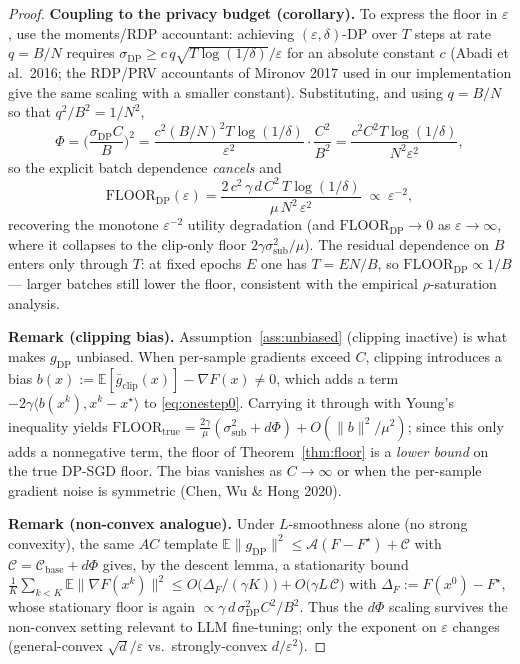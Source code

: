 \begin{proof}
\medskip
\noindent\textbf{Coupling to the privacy budget (corollary).}
To express the floor in $\varepsilon$, use the moments/RDP accountant: achieving $(\varepsilon,\delta)$-DP over $T$ steps at rate $q=B/N$ requires $\sigma_{\mathrm{DP}}\ge c\,q\sqrt{T\log(1/\delta)}/\varepsilon$ for an absolute constant $c$ (Abadi et al.\ 2016; the RDP/PRV accountants of Mironov 2017 used in our implementation give the same scaling with a smaller constant). Substituting, and using $q=B/N$ so that $q^2/B^2=1/N^2$,
\[
\Phi=\Big(\frac{\sigma_{\mathrm{DP}}C}{B}\Big)^2
=\frac{c^2 (B/N)^2 T\log(1/\delta)}{\varepsilon^2}\cdot\frac{C^2}{B^2}
=\frac{c^2 C^2 T\log(1/\delta)}{N^2\varepsilon^2},
\]
so the explicit batch dependence \emph{cancels} and
\[
\mathrm{FLOOR}_{\mathrm{DP}}(\varepsilon)=\frac{2\,c^2\,\gamma\,d\,C^2\,T\log(1/\delta)}{\mu\,N^2\,\varepsilon^2}\;\propto\;\varepsilon^{-2},
\]
recovering the monotone $\varepsilon^{-2}$ utility degradation (and $\mathrm{FLOOR}_{\mathrm{DP}}\to0$ as $\varepsilon\to\infty$, where it collapses to the clip-only floor $2\gamma\sigma_{\mathrm{sub}}^2/\mu$). The residual dependence on $B$ enters only through $T$: at fixed epochs $E$ one has $T=E N/B$, so $\mathrm{FLOOR}_{\mathrm{DP}}\propto 1/B$ --- larger batches still lower the floor, consistent with the empirical $\rho$-saturation analysis.

\medskip
\noindent\textbf{Remark (clipping bias).}
Assumption~\ref{ass:unbiased} (clipping inactive) is what makes $g_{\mathrm{DP}}$ unbiased. When per-sample gradients exceed $C$, clipping introduces a bias $b(x):=\mathbb E[\bar g_{\mathrm{clip}}(x)]-\nabla F(x)\ne0$, which adds a term $-2\gamma\langle b(x^k),x^k-x^\star\rangle$ to \eqref{eq:onestep0}. Carrying it through with Young's inequality yields $\mathrm{FLOOR}_{\mathrm{true}}=\tfrac{2\gamma}{\mu}(\sigma_{\mathrm{sub}}^2+d\Phi)+O(\|b\|^2/\mu^2)$; since this only adds a nonnegative term, the floor of Theorem~\ref{thm:floor} is a \emph{lower bound} on the true DP-SGD floor. The bias vanishes as $C\to\infty$ or when the per-sample gradient noise is symmetric (Chen, Wu \& Hong 2020).

\medskip
\noindent\textbf{Remark (non-convex analogue).}
Under $L$-smoothness alone (no strong convexity), the same $AC$ template $\mathbb E\|g_{\mathrm{DP}}\|^2\le \mathcal A(F-F^\star)+\mathcal C$ with $\mathcal C=\mathcal C_{\mathrm{base}}+d\Phi$ gives, by the descent lemma, a stationarity bound $\tfrac1K\sum_{k<K}\mathbb E\|\nabla F(x^k)\|^2\le O\!\big(\Delta_F/(\gamma K)\big)+O\!\big(\gamma L\,\mathcal C\big)$ with $\Delta_F:=F(x^0)-F^\star$, whose stationary floor is again $\propto \gamma\,d\,\sigma_{\mathrm{DP}}^2C^2/B^2$. Thus the $d\Phi$ scaling survives the non-convex setting relevant to LLM fine-tuning; only the exponent on $\varepsilon$ changes (general-convex $\sqrt d/\varepsilon$ vs.\ strongly-convex $d/\varepsilon^2$).


\end{proof}
